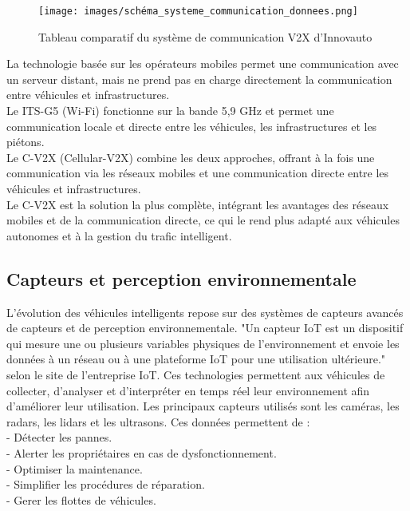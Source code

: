 \documentclass{article}
\begin{document}
\begin{figure}[h]
    \centering
    \texttt{[image: images/schéma\_systeme\_communication\_donnees.png]} 
    \caption{Tableau comparatif du système de communication V2X d'Innovauto}
\end{figure}

La technologie basée sur les opérateurs mobiles permet une communication avec un serveur distant, mais ne prend pas en charge directement la communication entre véhicules et infrastructures.\\
Le ITS-G5 (Wi-Fi) fonctionne sur la bande 5,9 GHz et permet une communication locale et directe entre les véhicules, les infrastructures et les piétons.\\
Le C-V2X (Cellular-V2X) combine les deux approches, offrant à la fois une communication via les réseaux mobiles et une communication directe entre les véhicules et infrastructures.\\
Le C-V2X est la solution la plus complète, intégrant les avantages des réseaux mobiles et de la communication directe, ce qui le rend plus adapté aux véhicules autonomes et à la gestion du trafic intelligent.

\subsection{Capteurs et perception environnementale}
L'évolution des véhicules intelligents repose sur des systèmes de capteurs avancés de capteurs et de perception environnementale.
"Un capteur IoT est un dispositif qui mesure une ou plusieurs variables physiques de l'environnement et envoie les données à un réseau ou à une plateforme IoT pour une utilisation ultérieure." selon le site de l'entreprise IoT\cite{iot_capteur}.
Ces technologies permettent aux véhicules de collecter, d'analyser et d'interpréter en temps réel leur environnement afin d'améliorer leur utilisation.
Les principaux capteurs utilisés sont les caméras, les radars, les lidars et les ultrasons.
Ces données permettent de :\\
- Détecter les pannes. \\
- Alerter les propriétaires en cas de dysfonctionnement. \\
- Optimiser la maintenance. \\
- Simplifier les procédures de réparation. \\
- Gerer les flottes de véhicules. \\
\end{document}
